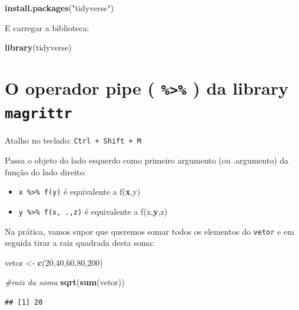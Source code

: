 \documentclass[
]{book}
\newenvironment{Shaded}{\begin{snugshade}}{\end{snugshade}}
\newcommand{\CommentTok}[1]{\textcolor[rgb]{0.56,0.35,0.01}{\textit{#1}}}
\newcommand{\DecValTok}[1]{\textcolor[rgb]{0.00,0.00,0.81}{#1}}
\newcommand{\FunctionTok}[1]{\textcolor[rgb]{0.13,0.29,0.53}{\textbf{#1}}}
\newcommand{\NormalTok}[1]{#1}
\newcommand{\OtherTok}[1]{\textcolor[rgb]{0.56,0.35,0.01}{#1}}
\newcommand{\StringTok}[1]{\textcolor[rgb]{0.31,0.60,0.02}{#1}}
\begin{document}
\begin{Shaded}
\begin{Highlighting}[]
\FunctionTok{install.packages}\NormalTok{(}\StringTok{"tidyverse"}\NormalTok{)}
\end{Highlighting}
\end{Shaded}

E carregar a biblioteca:

\begin{Shaded}
\begin{Highlighting}[]
\FunctionTok{library}\NormalTok{(tidyverse)}
\end{Highlighting}
\end{Shaded}

\section{\texorpdfstring{O operador pipe ( \texttt{\%\textgreater{}\%} ) da library \texttt{magrittr}}{O operador pipe ( \%\textgreater\% ) da library magrittr}}\label{o-operador-pipe-da-library-magrittr}

Atalho no teclado: \texttt{Ctrl\ +\ Shift\ +\ M}

Passa o objeto do lado esquerdo como primeiro argumento (ou
.argumento) da função do lado direito:

\begin{itemize}
\item
  \texttt{x\ \%\textgreater{}\%\ f(y)} é equivalente a f(\textbf{x},y)
\item
  \texttt{y\ \%\textgreater{}\%\ f(x,\ .,z)} é equivalente a f(x,\textbf{y},z)
\end{itemize}

Na prática, vamos supor que queremos somar todos os elementos do \texttt{vetor} e em seguida tirar a raiz quadrada desta soma:

\begin{Shaded}
\begin{Highlighting}[]
\NormalTok{vetor }\OtherTok{\textless{}{-}} \FunctionTok{c}\NormalTok{(}\DecValTok{20}\NormalTok{,}\DecValTok{40}\NormalTok{,}\DecValTok{60}\NormalTok{,}\DecValTok{80}\NormalTok{,}\DecValTok{200}\NormalTok{)}

\CommentTok{\#raiz da soma}
\FunctionTok{sqrt}\NormalTok{(}\FunctionTok{sum}\NormalTok{(vetor))}
\end{Highlighting}
\end{Shaded}

\begin{verbatim}
## [1] 20
\end{verbatim}
\end{document}
